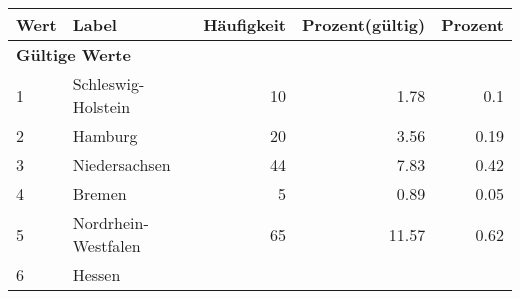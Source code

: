      \begin{longtable}{lXrrr}
     \toprule
     \textbf{Wert} & \textbf{Label} & \textbf{Häufigkeit} & \textbf{Prozent(gültig)} & \textbf{Prozent} \\
     \endhead
     \midrule
     \multicolumn{5}{l}{\textbf{Gültige Werte}}\\

     1 &
     \multicolumn{1}{X}{ Schleswig-Holstein   } &


       \num{10} &
       \num[round-mode=places,round-precision=2]{1,78} &
         \num[round-mode=places,round-precision=2]{0,1} \\

     2 &
     \multicolumn{1}{X}{ Hamburg   } &


       \num{20} &
       \num[round-mode=places,round-precision=2]{3,56} &
         \num[round-mode=places,round-precision=2]{0,19} \\

     3 &
     \multicolumn{1}{X}{ Niedersachsen   } &


       \num{44} &
       \num[round-mode=places,round-precision=2]{7,83} &
         \num[round-mode=places,round-precision=2]{0,42} \\

     4 &
     \multicolumn{1}{X}{ Bremen   } &


       \num{5} &
       \num[round-mode=places,round-precision=2]{0,89} &
         \num[round-mode=places,round-precision=2]{0,05} \\

     5 &
     \multicolumn{1}{X}{ Nordrhein-Westfalen   } &


       \num{65} &
       \num[round-mode=places,round-precision=2]{11,57} &
         \num[round-mode=places,round-precision=2]{0,62} \\

     6 &
     \multicolumn{1}{X}{ Hessen   } &



\end{longtable}

